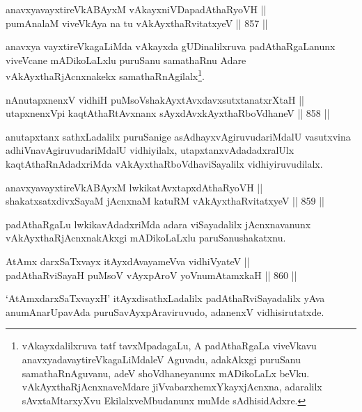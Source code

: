 
\begin{shl}
anavxyavayxtireVkABAyxM vAkayxniVDapadAthaRyoVH || \\
pumAnalaM viveVkAya na tu vAkAyxthaRvitatxyeV \hfill || 857 ||  
\end{shl}

\begin{artha}
anavxya vayxtireVkagaLiMda vAkayxda gUDinalilxruva padAthaRgaLanunx viveVcane mADikoLaLxlu puruSanu samathaRnu Adare vAkAyxthaRjAcnxnakekx samathaRnAgilalx\footnote{vAkayxdalilxruva tatf tavxMpadagaLu, A padAthaRgaLa viveVkavu anavxyadavaytireVkagaLiMdaleV Aguvadu, adakAkxgi puruSanu samathaRnAguvanu, adeV shoVdhaneyanunx mADikoLaLx beVku. vAkAyxthaRjAcnxnaveMdare jiVvabarxhemxYkayxjAcnxna, adaralilx sAvxtaMtarxyXvu EkilalxveMbudanunx muMde sAdhisidAdxre.}.
\end{artha}

\begin{shl}
nAnutapxnenxV vidhiH puMsoV\s shakAyxtAvxdavxsutxtanatxrXtaH || \\
utapxnenxV\s pi kaqtAthaRtAvxnanx sAyxdAvxkAyxthaRboVdhaneV \hfill || 858 ||  
\end{shl}

\begin{artha}
anutapxtanx sathxLadalilx puruSanige asAdhayxvAgiruvudariMdalU vasutxvina adhiVnavAgiruvudariMdalU vidhiyilalx, utapxtanxvAdadadxralUlx kaqtAthaRnAdadxriMda vAkAyxthaRboVdhaviSayalilx vidhiyiruvudilalx.
\end{artha}

\begin{shl}
anavxyavayxtireVkABAyxM lwkikatAvxtapxdAthaRyoVH || \\
shakatxsatxdivxSayaM jAcnxnaM katuRM vAkAyxthaRvitatxyeV \hfill || 859 ||  
\end{shl}

\begin{artha}
padAthaRgaLu lwkikavAdadxriMda adara viSayadalilx jAcnxnavanunx vAkAyxthaRjAcnxnakAkxgi mADikoLaLxlu paruSanushakatxnu.
\end{artha}

\begin{shl}
AtAmx darxSaTxvayx itAyxdAvayameVva vidhiVyateV || \\
padAthaRviSayaH puMsoV vAyxpAroV yoV\s numAtamxkaH \hfill || 860 ||  
\end{shl}

\begin{artha}
`AtAmxdarxSaTxvayxH' itAyxdisathxLadalilx padAthaRviSayadalilx yAva anumAnarUpavAda puruSavAyxpAraviruvudo, adanenxV vidhisirutatxde.
\end{artha}

